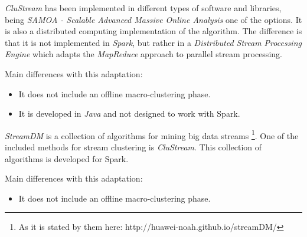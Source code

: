 

\textit{CluStream} has been implemented in different types of software and libraries, being \textit{SAMOA - Scalable Advanced Massive Online Analysis} one of the options. It is also a distributed computing implementation of the algorithm. The difference is that it is not implemented in \textit{Spark}, but rather in a \textit{Distributed Stream Processing Engine} which adapts the \textit{MapReduce} approach to parallel stream processing\cite{samoa}.

Main differences with this adaptation: 

\begin{itemize}
 \item It does not include an offline macro-clustering phase.
 \item It is developed in \textit{Java} and not designed to work with Spark.
\end{itemize}

\textit{StreamDM} is a collection of algorithms for mining big data streams \footnote{As it is stated by them here: http://huawei-noah.github.io/streamDM/}. One of the included methods for stream clustering is \textit{CluStream}. This collection of algorithms is developed for Spark.

Main differences with this adaptation: 

\begin{itemize}
 \item It does not include an offline macro-clustering phase.
\end{itemize}